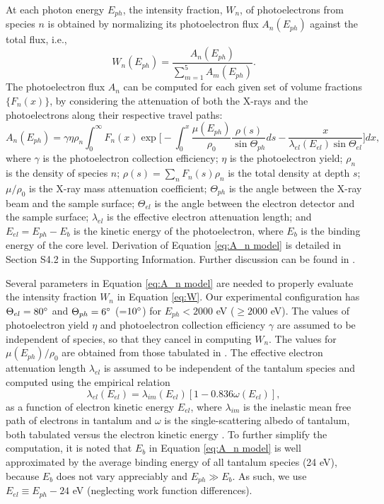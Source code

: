 \documentclass{WileyMSP-template}
\begin{document}
At each photon energy $E_{ph}$, the intensity fraction, $W_n$, of photoelectrons from species $n$ is obtained by normalizing its photoelectron flux $A_n(E_{ph})$ against the total flux, i.e.,
\begin{equation}\label{eq:W}
W_n(E_{ph}) = \frac{ A_n(E_{ph})}{\sum_{m=1}^5A_m(E_{ph})}.
\end{equation}
The photoelectron flux $A_n$ can be computed for each given set of volume fractions $\{F_n(x)\}$, by considering the attenuation of both the X-rays and the photoelectrons along their respective travel paths:
\begin{equation} \label{eq:A_n model}
    A_n(E_{ph}) = \gamma \eta \rho_n \int_0^\infty F_n(x) 
    \exp \bigg[-\int_0^x \frac{\mu(E_{ph})}{\rho_0} \frac{\rho(s)}{\sin\Theta_{ph}} ds - \frac{x}{\lambda_{el}(E_{el})\sin\Theta_{el}}\bigg] dx,
\end{equation}
where $\gamma$ is the photoelectron collection efficiency; $\eta$ is the photoelectron yield; $\rho_n$ is the density of species $n$; $\rho(s) = \sum\limits_nF_n(s)\rho_n$ is the total density at depth $s$; $\mu/\rho_0$ is the X-ray mass attenuation coefficient; $\Theta_{ph}$ is the angle between the X-ray beam and the sample surface; $\Theta_{el}$ is the angle between the electron detector and the sample surface; $\lambda_{el}$ is the effective electron attenuation length; and $E_{el} = E_{ph}-E_b$ is the kinetic energy of the photoelectron, where $E_b$ is the binding energy of the core level. Derivation of Equation \ref{eq:A_n model} is detailed in Section S4.2 in the Supporting Information. Further discussion can be found in \cite{jablonski_effective_2020}. 

Several parameters in Equation \ref{eq:A_n model} are needed to properly evaluate the intensity fraction $W_n$ in Equation \ref{eq:W}. Our experimental configuration has $\Theta_{el} = 80\degree$ and $\Theta_{ph}=6\degree$ (=$10\degree$) for $E_{ph}<2000$ eV ($\geq2000$ eV). The values of  photoelectron yield $\eta$ and photoelectron collection efficiency $\gamma$ are assumed to be independent of species, so that they cancel in computing $W_n$. The values for $\mu(E_{ph})/\rho_0$ are obtained from those tabulated in \cite{X_ray_attenuation_Henke:1993}. The effective electron attenuation length $\lambda_{el}$ is assumed to be independent of the tantalum species and computed using the empirical relation \cite{EAL_albedo:2020}
\begin{equation}\label{eq:EAL}
\lambda_{el}(E_{el}) = \lambda_{im}(E_{el})[1-0.836\omega(E_{el})],
\end{equation}
as a function of electron kinetic energy $E_{el}$, where $\lambda_{im}$ is the inelastic mean free path of electrons in tantalum and $\omega$ is the single-scattering albedo of tantalum, both tabulated versus the electron kinetic energy \cite{IMFP_tabulated:2015,EAL_albedo:2020}. To further simplify the computation, it is noted that $E_b$ in Equation \ref{eq:A_n model} is well approximated by the average binding energy of all tantalum species (24 eV), because $E_b$ does not vary appreciably and $E_{ph}\gg E_b$. As such, we use $E_{el}\equiv E_{ph}-24$ eV (neglecting work function differences). 
\end{document}
